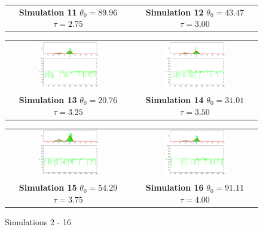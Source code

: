 \begin{figure}
\begin{tabular}{cc}
\textbf{Simulation 11} $\theta_0=   89.96$  $\tau=    2.75$  & \textbf{Simulation 12} $\theta_0=   43.47$  $\tau=    3.00$
\end{tabular}
\begin{tabular}{cc} 
\includegraphics[width=0.5\textwidth]{ImaginiLatex/MetropolisExample13.eps} &
\includegraphics[width=0.5\textwidth]{ImaginiLatex/MetropolisExample14.eps} \\
\textbf{Simulation 13} $\theta_0=   20.76$  $\tau=    3.25$  & \textbf{Simulation 14} $\theta_0=   31.01$  $\tau=    3.50$
\end{tabular}
\begin{tabular}{cc} 
\includegraphics[width=0.5\textwidth]{ImaginiLatex/MetropolisExample15.eps} &
\includegraphics[width=0.5\textwidth]{ImaginiLatex/MetropolisExample16.eps} \\
\textbf{Simulation 15} $\theta_0=   54.29$  $\tau=    3.75$  & \textbf{Simulation 16} $\theta_0=   91.11$  $\tau=    4.00$
\end{tabular}
\caption{Simulations 2 - 16}
\end{figure}
